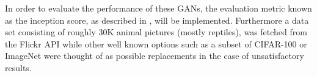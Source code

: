 In order to evaluate the performance of these GANs, the evaluation metric known as the inception score, as described in \cite{salimans2016improved}, will be implemented. Furthermore a data set consisting of roughly 30K animal pictures (mostly reptiles), was fetched from the Flickr API while other well known options such as a subset of CIFAR-100 or ImageNet were thought of as possible replacements in the case of unsatisfactory results.

